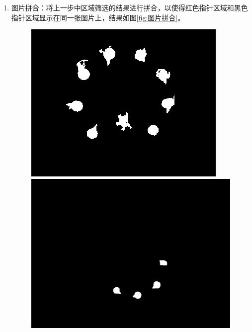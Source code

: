 \documentclass[a4paper]{ctexart}
\begin{document}
\begin{enumerate}[label=\arabic*、]
	\item 图片拼合：将上一步中区域筛选的结果进行拼合，以使得红色指针区域和黑色指针区域显示在同一张图片上，结果如图\ref{fig:图片拼合}。
	\begin{figure}[htbp]
		\centering
		\begin{minipage}[t]{0.25\textwidth}
			\centering
			\includegraphics[width=\textwidth]{figure/add/img1.jpg}
		\end{minipage}
		\begin{minipage}[t]{0.25\textwidth}
			\centering
			\includegraphics[width=\textwidth]{figure/add/img2.jpg}
		\end{minipage}\\

\end{figure}
\end{enumerate}
\end{document}
